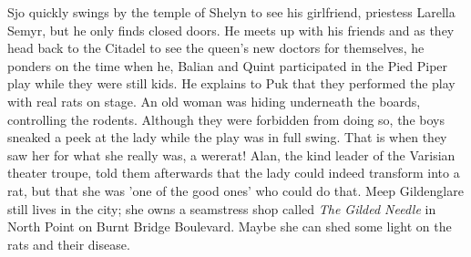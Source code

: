 Sjo quickly swings by the temple of Shelyn to see his girlfriend, priestess Larella Semyr, but he only finds closed doors. He meets up with his friends and as they head back to the Citadel to see the queen's new doctors for themselves, he ponders on the time when he, Balian and Quint participated in the Pied Piper play while they were still kids. He explains to Puk that they performed the play with real rats on stage. An old woman was hiding underneath the boards, controlling the rodents. Although they were forbidden from doing so, the boys sneaked a peek at the lady while the play was in full swing. That is when they saw her for what she really was, a wererat! Alan, the kind leader of the Varisian theater troupe, told them afterwards that the lady could indeed transform into a rat, but that she was 'one of the good ones' who could do that. Meep Gildenglare still lives in the city; she owns a seamstress shop called {\itshape The Gilded Needle} in North Point on Burnt Bridge Boulevard. Maybe she can shed some light on the rats and their disease. 